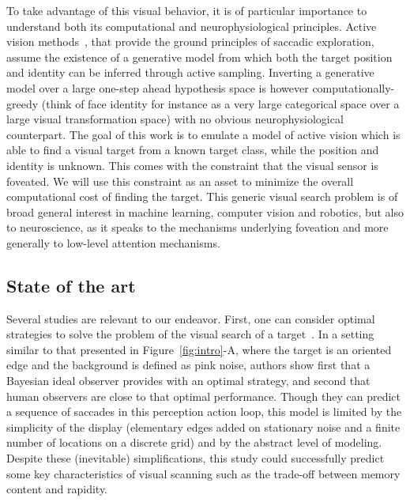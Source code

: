 
To take advantage of this visual behavior, it is of particular importance to understand both its computational and neurophysiological principles.
Active vision methods~\citep{Najemnik05,Butko2010infomax,Friston12}, that provide the ground principles of saccadic exploration, assume the existence of a generative model from which both the target position and identity can be inferred through active sampling. Inverting a generative model over a large one-step ahead hypothesis space is however computationally-greedy (think of face identity for instance as a very large categorical space over a large visual transformation space) with no obvious neurophysiological counterpart.
The goal of this work is to emulate a model of active vision which is able to find a visual target from a known target class, while the position and identity is unknown. This comes with the constraint that the visual sensor is foveated. We will use this constraint as an asset to minimize the overall computational cost of finding the target. This generic visual search problem is of broad general interest in machine learning, computer vision and robotics, but also to neuroscience, as it speaks to the mechanisms underlying foveation and more generally to low-level attention mechanisms. 

\CNS

\subsection{State of the art}
Several studies are relevant to our endeavor. First, one can consider optimal strategies to solve the problem of the visual search of a target~\citep{Najemnik05}. In a setting similar to that presented in Figure~\ref{fig:intro}-A, where the target is an oriented edge and the background is defined as pink noise, authors show first that a Bayesian ideal observer provides with an optimal strategy, and second that human observers are close to that optimal performance. Though they can predict a sequence of saccades in this perception action loop, this model is limited by the simplicity of the display (elementary edges added on stationary noise and a finite number of locations on a discrete grid) and by the abstract level of modeling. Despite these (inevitable) simplifications, this study could successfully predict some key characteristics of visual scanning such as the trade-off between memory content and rapidity.

